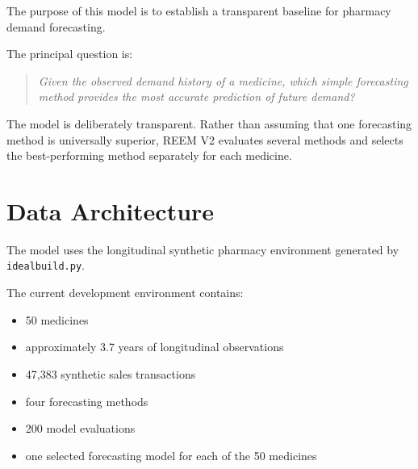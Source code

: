 \documentclass[11pt,a4paper]{article}
\begin{document}
The purpose of this model is to establish a transparent baseline for
pharmacy demand forecasting.

The principal question is:

\begin{quote}
\textit{Given the observed demand history of a medicine, which simple
forecasting method provides the most accurate prediction of future demand?}
\end{quote}

The model is deliberately transparent. Rather than assuming that one
forecasting method is universally superior, REEM V2 evaluates several
methods and selects the best-performing method separately for each
medicine.

\section{Data Architecture}

The model uses the longitudinal synthetic pharmacy environment generated
by \texttt{idealbuild.py}.

\begin{center}
\end{center}

The current development environment contains:

\begin{itemize}[leftmargin=1.5cm]
\item 50 medicines
\item approximately 3.7 years of longitudinal observations
\item 47,383 synthetic sales transactions
\item four forecasting methods
\item 200 model evaluations
\item one selected forecasting model for each of the 50 medicines
\end{itemize}
\end{document}
